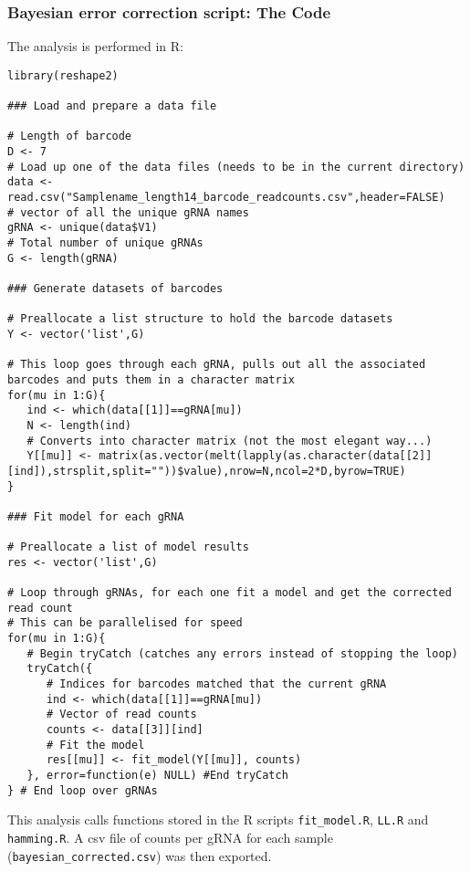 \subsubsection{Bayesian error correction script: The Code}

The analysis is  performed in R:

\begin{small}\begin{lstlisting}
library(reshape2)

### Load and prepare a data file

# Length of barcode
D <- 7
# Load up one of the data files (needs to be in the current directory)
data <- read.csv("Samplename_length14_barcode_readcounts.csv",header=FALSE)
# vector of all the unique gRNA names
gRNA <- unique(data$V1)
# Total number of unique gRNAs
G <- length(gRNA)

### Generate datasets of barcodes

# Preallocate a list structure to hold the barcode datasets
Y <- vector('list',G)

# This loop goes through each gRNA, pulls out all the associated barcodes and puts them in a character matrix
for(mu in 1:G){
   ind <- which(data[[1]]==gRNA[mu])
   N <- length(ind)
   # Converts into character matrix (not the most elegant way...)
   Y[[mu]] <- matrix(as.vector(melt(lapply(as.character(data[[2]][ind]),strsplit,split=""))$value),nrow=N,ncol=2*D,byrow=TRUE)
}

### Fit model for each gRNA

# Preallocate a list of model results
res <- vector('list',G)

# Loop through gRNAs, for each one fit a model and get the corrected read count
# This can be parallelised for speed
for(mu in 1:G){
   # Begin tryCatch (catches any errors instead of stopping the loop)
   tryCatch({
      # Indices for barcodes matched that the current gRNA
      ind <- which(data[[1]]==gRNA[mu])
      # Vector of read counts
      counts <- data[[3]][ind]
      # Fit the model
      res[[mu]] <- fit_model(Y[[mu]], counts)
   }, error=function(e) NULL) #End tryCatch
} # End loop over gRNAs
\end{lstlisting}\end{small}

This analysis calls functions stored in the R scripts \verb|fit_model.R|, \verb|LL.R| and \verb|hamming.R|.
A csv file of counts per gRNA for each sample (\verb|bayesian_corrected.csv|) was then exported.


